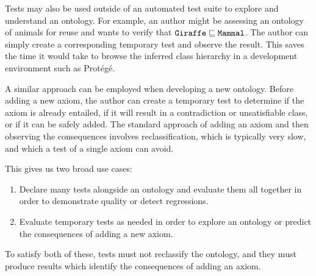 \documentclass[paper.tex]{subfiles}
\begin{document}
Tests may also be used outside of an automated test suite to explore and understand an ontology.
For example, an author might be assessing an ontology of animals for reuse and wants to verify that $\mathtt{Giraffe} \sqsubseteq \mathtt{Mammal}$.
The author can simply create a corresponding temporary test and observe the result.
This saves the time it would take to browse the inferred class hierarchy in a development environment such as Prot\'eg\'e.

A similar approach can be employed when developing a new ontology.
Before adding a new axiom, the author can create a temporary test to determine if the axiom is already entailed, if it will result in a contradiction or unsatisfiable class, or if it can be safely added.
The standard approach of adding an axiom and then observing the consequences involves reclassification, which is typically very slow, and which a test of a single axiom can avoid.

This gives us two broad use cases:
\begin{enumerate}[nosep]
  \item
  \label{enum:usecase:regression}
  Declare many tests alongside an ontology and evaluate them all together in order to demonstrate quality or detect regressions.

  \item
  \label{enum:usecase:temp}
  Evaluate temporary tests as needed in order to explore an ontology or predict the consequences of adding a new axiom.
\end{enumerate}

To satisfy both of these, tests must not reclassify the ontology, and they must produce results which identify the consequences of adding an axiom.
\end{document}

